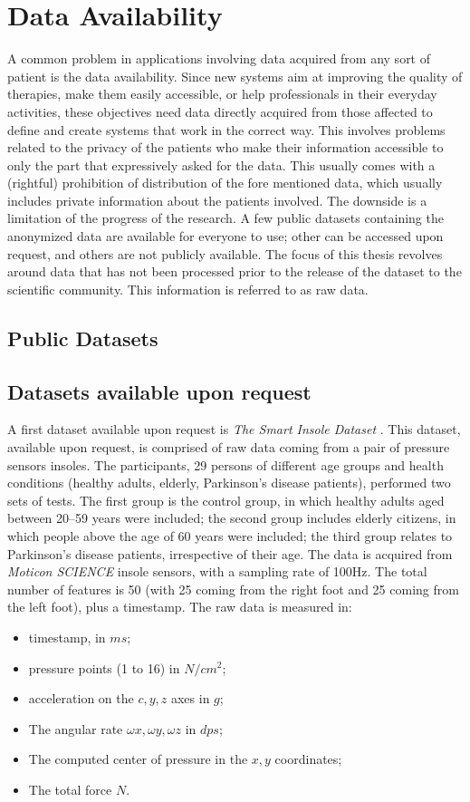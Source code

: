 \section{Data Availability}
A common problem in applications involving data acquired from any sort of patient is the data availability. Since new systems aim at improving the quality of therapies, make them easily accessible, or help professionals in their everyday activities, these objectives need data directly acquired from those affected to define and create systems that work in the correct way. This involves problems related to the privacy of the patients who make their information accessible to only the part that expressively asked for the data. This usually comes with a (rightful) prohibition of distribution of the fore mentioned data, which usually includes private information about the patients involved. The downside is a limitation of the progress of the research. 
A few public datasets containing the anonymized data are available for everyone to use; other can be accessed upon request, and others are not publicly available. The focus of this thesis revolves around data that has not been processed prior to the release of the dataset to the scientific community. This information is referred to as raw data.
\subsection{Public Datasets}
\subsection{Datasets available upon request}
A first dataset available upon request is \textit{The Smart Insole Dataset} \cite{TheSmartInsoleDataset}. This dataset, available upon request, is comprised of raw data coming from a pair of pressure sensors insoles.
The participants, 29 persons of different age groups and health conditions (healthy adults, elderly, Parkinson’s disease patients), performed two sets of tests. The first group is the control group, in which healthy adults aged between 20–59 years were included; the second group includes elderly citizens, in which people above the age of 60 years were included; the third group relates to Parkinson’s disease patients, irrespective of their age. 
The data is acquired from \textit{Moticon SCIENCE} insole sensors, with a sampling rate of 100Hz. The total number of features is 50 (with 25 coming from the right foot and 25 coming from the left foot), plus a timestamp. The raw data is measured in: 
\begin{itemize}
    \item timestamp, in \(ms\);
    \item pressure points (1 to 16) in \(N/cm^2\);
    \item acceleration on the \(c, y, z\) axes in \(g\);
    \item The angular rate \(\omega x, \omega y, \omega z\) in \(dps\);
    \item The computed center of pressure in the \(x,y\) coordinates;
    \item The total force \(N\).
\end{itemize}

